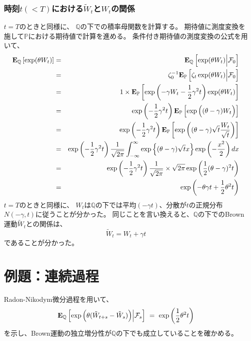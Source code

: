 \documentclass[uplatex,a4j,12pt,dvipdfmx]{jsarticle}
\begin{document}
\subsubsection{時刻$t(<T)$における$\tilde{W}_{t}$と$W_{t}$の関係}

$t=T$のときと同様に、
$\mathbb{Q}$の下での積率母関数を計算する。
期待値に測度変換を施して$\mathbb{P}$における期待値で計算を進める。
条件付き期待値の測度変換の公式を用いて、
%
\begin{eqnarray*}
	{\bf E}_{\mathbb{Q}}
	\left[ \exp ( \theta W_{t} ) \right]
	&=&
	{\bf E}_{\mathbb{Q}}
	\left[ \exp ( \theta W_{t} ) \Big| \mathcal{F}_{0} \right]
	\\ &=&
	\zeta_{0}^{-1}
	{\bf E}_{\mathbb{P}}
	\left[ \zeta_{t} \exp ( \theta W_{t} ) \Big| \mathcal{F}_{0} \right]
	\\ &=&
	1 \times
	{\bf E}_{\mathbb{P}}
	\left[ \exp \left( - \gamma W_{t} - \dfrac{1}{2} \gamma^{2} t \right) \exp ( \theta W_{t} ) \right]
	\\ &=&
	\exp \left( - \dfrac{1}{2} \gamma^{2} t \right)
	{\bf E}_{\mathbb{P}}
	\left[ \exp \Big( ( \theta - \gamma ) W_{t} \Big) \right]
	\\ &=&
	\exp \left( - \dfrac{1}{2} \gamma^{2} t \right)
	{\bf E}_{\mathbb{P}}
	\left[ \exp \left( ( \theta - \gamma ) \sqrt{t} \dfrac{ W_{t} }{ \sqrt{t} } \right) \right]
	\\ &=&
	\exp \left( - \dfrac{1}{2} \gamma^{2} t \right)
	\dfrac{1}{\sqrt{2 \pi}}
	\int^{\infty}_{-\infty}
	\exp \left\{ ( \theta - \gamma ) \sqrt{t} x \right\} \exp \left( -\dfrac{x^{2}}{2} \right) dx
	\\ &=&
	\exp \left( - \dfrac{1}{2} \gamma^{2} t \right)
	\dfrac{1}{\sqrt{2 \pi}}
	\times \sqrt{ 2 \pi }
	\exp \left( \dfrac{1}{2} (\theta - \gamma)^{2} t \right)
	\\ &=&
	\exp \left( - \theta \gamma t + \dfrac{1}{2} \theta^{2} t \right)
\end{eqnarray*}
%
$t=T$のときと同様に、
$W_{t}$は$\mathbb{Q}$の下では平均$(- \gamma t)$、分散が$t$の正規分布$N(- \gamma , t)$に従うことが分かった。
同じことを言い換えると、$\mathbb{Q}$の下でのBrown運動$\tilde{W}_{t}$との関係は、
$$
	\tilde{W}_{t} = W_{t} + \gamma t
$$
であることが分かった。

\section{例題：連続過程}

Radon-Nikodym微分過程を用いて、
$$
	{\bf E}_{\mathbb{Q}}
	\left[ \exp \Big( \theta (\tilde{W}_{t+s} - \tilde{W}_{s}) \Big) \Big| \mathcal{F}_{s} \right]
	\ = \
	\exp \left( \dfrac{1}{2} \theta^{2} t \right)
$$
を示し、Brown運動の独立増分性が$\mathbb{Q}$の下でも成立していることを確かめる。
\end{document}
